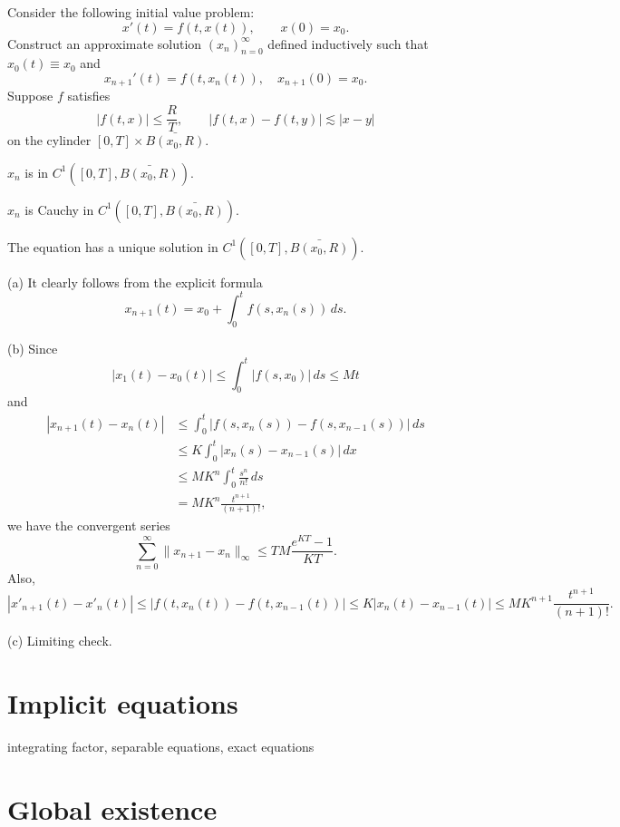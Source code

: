 \documentclass{../../large}
\begin{document}
\begin{prb}
Consider the following initial value problem:
\[x'(t)=f(t,x(t)),\qquad x(0)=x_0.\]
Construct an approximate solution $(x_n)_{n=0}^\infty$ defined inductively such that $x_0(t)\equiv x_0$ and
\[x_{n+1}'(t)=f(t,x_n(t)),\quad x_{n+1}(0)=x_0.\]
Suppose $f$ satisfies
\[|f(t,x)|\le \frac RT,\qquad|f(t,x)-f(t,y)|\lesssim|x-y|\]
on the cylinder $[0,T]\times\bar{B(x_0,R)}$.
\begin{parts}
\item $x_n$ is in $C^1([0,T],\bar{B(x_0,R)})$.
\item $x_n$ is Cauchy in $C^1([0,T],\bar{B(x_0,R)})$.
\item The equation has a unique solution in $C^1([0,T],\bar{B(x_0,R)})$.
\end{parts}
\end{prb}
\begin{pf}
(a)
It clearly follows from the explicit formula
\[x_{n+1}(t)=x_0+\int_0^tf(s,x_n(s))\,ds.\]

(b)
Since
\[|x_1(t)-x_0(t)|\le\int_0^t|f(s,x_0)|\,ds\le Mt\]
and
\begin{align*}
|x_{n+1}(t)-x_n(t)|
&\le\int_0^t|f(s,x_n(s))-f(s,x_{n-1}(s))|\,ds\\
&\le K\int_0^t|x_n(s)-x_{n-1}(s)|\,dx\\
&\le MK^n\int_0^t\frac{s^n}{n!}\,ds\\
&=MK^n\frac{t^{n+1}}{(n+1)!},
\end{align*}
we have the convergent series
\[\sum_{n=0}^\infty\|x_{n+1}-x_n\|_\infty\le TM\frac{e^{KT}-1}{KT}.\]
Also,
\[|x'_{n+1}(t)-x'_n(t)|\le|f(t,x_n(t))-f(t,x_{n-1}(t))|\le K|x_n(t)-x_{n-1}(t)|\le MK^{n+1}\frac{t^{n+1}}{(n+1)!}.\]

(c)
Limiting check.
\end{pf}

\begin{prb}
\end{prb}

\begin{prb}
\end{prb}


\section{Implicit equations}
integrating factor, separable equations, exact equations


\section{Global existence}
\begin{prb}

\end{prb}
\begin{prb}

\end{prb}
\end{document}
